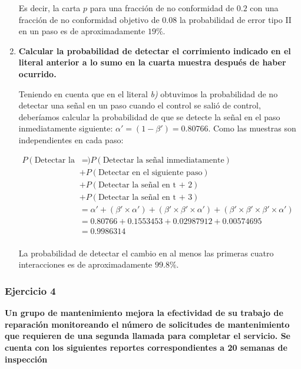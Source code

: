 \documentclass{article}
\begin{document}
\begin{enumerate}[label= \textbf{\alph*)}]
    Es decir, la carta $p$ para una fracción de no conformidad de $0.2$ con una fracción de no conformidad objetivo de $0.08$ la probabilidad de error tipo II en un paso es de aproximadamente $19\%$. 
    
    \item \textbf{Calcular la probabilidad de detectar el corrimiento indicado en el literal anterior a lo sumo en la cuarta muestra después de haber ocurrido.}

    Teniendo en cuenta que en el literal \textit{b)} obtuvimos la  probabilidad de no detectar una señal en un paso cuando el control se salió de control, deberíamos calcular la probabilidad de que se detecte la señal en el paso inmediatamente siguiente: $\alpha' = (1 - \beta') = 0.80766$. Como las muestras son independientes en cada paso:

    \begin{align*}
        P(\text{Detectar la señal a lo sumo en cuatro pasos})&= P(\text{Detectar la señal inmediatamente})&& \\
        &+ P(\text{Detectar en el siguiente paso}) && \\
        &+ P(\text{Detectar la señal en t + 2}) && \\
        &+ P(\text{Detectar la señal en t + 3}) && \\
        &= \alpha' + (\beta' \times \alpha') + (\beta' \times \beta' \times \alpha') + (\beta' \times \beta' \times \beta' \times \alpha') \\
        &= 0.80766 + 0.1553453 + 0.02987912 + 0.00574695 \\
        &= 0.9986314 \\
    \end{align*}

    La probabilidad de detectar el cambio en al menos las primeras cuatro interacciones es de aproximadamente $99.8\%$.
\end{enumerate}

\newpage

\subsubsection*{Ejercicio 4} \textbf{Un grupo de mantenimiento mejora la efectividad de su trabajo de reparación monitoreando el número de solicitudes de mantenimiento que requieren de una segunda llamada para completar el servicio. Se cuenta con los siguientes reportes correspondientes a 20 semanas de inspección}
\end{document}

